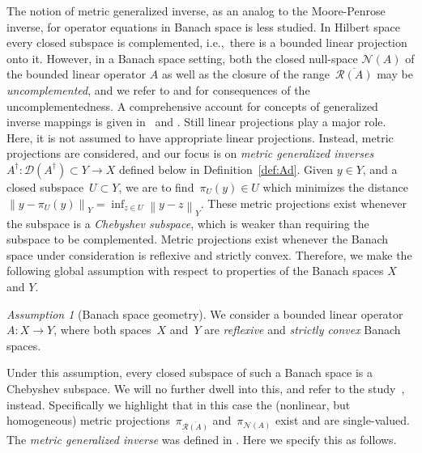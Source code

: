 \documentclass[12pt]{amsart}
\newcommand{\norm}[2]{\left\|#1\right\|_{#2}}
\newcommand{\domain}{\mathcal D}
\newcommand{\range}{\mathcal R}
\newcommand{\N}{\mathcal N}
\newcommand{\Ad}{A^\dag}
\theoremstyle{remark}
\newtheorem{assumption}{Assumption}
\begin{document}
The notion of metric generalized inverse, as an analog to the Moore-Penrose inverse, for operator equations in Banach space
is less studied. In Hilbert space every closed subspace is
complemented, i.e.,\ there is a bounded linear projection onto it.
However, in a Banach space setting, both the closed null-space $\N(A)$ of the bounded linear operator $A$ 
as well as the closure of the range~$\overline{\range(A)}$ may be \emph{uncomplemented},
and we refer to \cite{Flemmingbuch18} and \cite{HofKin25} for consequences of the uncomplementedness. 
A comprehensive account for concepts of generalized inverse mappings is given in~\cite{Nashed76} and \cite{NashedVotruba76}. Still linear projections play a major role.
Here, it is not assumed to have appropriate linear projections. Instead,
metric projections are considered, and our focus is on \emph{metric generalized inverses} $\Ad\colon \domain(\Ad) \subset Y \to X$
defined below in Definition~\ref{def:Ad}.
Given $y\in Y$, and a closed
subspace~$U \subset Y$, we are to find~$\pi_{U}(y)\in U$ which
minimizes the distance~$\norm{y - \pi_{U}(y)}{Y} = \inf_{z\in U}\norm{
y - z}{Y}$. These metric projections  exist whenever the subspace
is a \emph{Chebyshev subspace}, which is weaker than requiring the subspace
to be complemented. Metric projections exist whenever the Banach
space under consideration is reflexive and strictly convex. Therefore, we make the
following global assumption with respect to properties of the Banach spaces $X$ and $Y$. 
\begin{assumption}[Banach space geometry]\label{ass:geometry}
We consider a bounded linear operator $A \colon X \to Y$, where both spaces~$X$ and~$Y$ are \emph{reflexive} and \emph{strictly convex} Banach spaces.
\end{assumption}
Under this assumption, every closed
subspace of such a Banach space is a Chebyshev subspace. We will no further
dwell into this, and refer to the study~\cite{MR2024990},
instead. Specifically we highlight that in this case the (nonlinear, but homogeneous) metric
projections~$\pi_{\overline{\range(A)}}$
and~$\pi_{\N(A)}$ exist and are single-valued. 
The \emph{metric generalized inverse} was defined in \cite{MR2024990}. Here we specify this  as follows.
\end{document}
